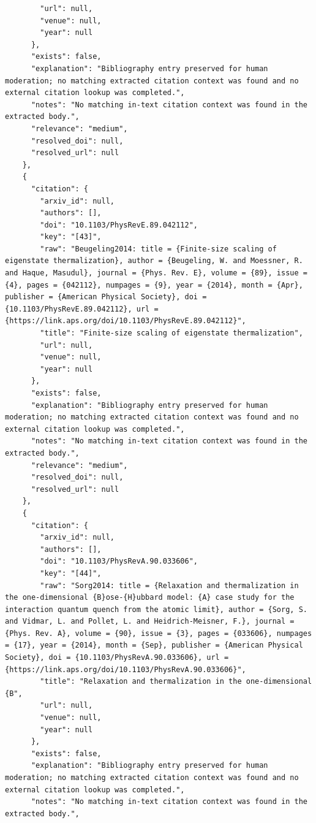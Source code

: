 \documentclass[11pt]{article}
\begin{document}
\begin{verbatim}
        "url": null,
        "venue": null,
        "year": null
      },
      "exists": false,
      "explanation": "Bibliography entry preserved for human moderation; no matching extracted citation context was found and no external citation lookup was completed.",
      "notes": "No matching in-text citation context was found in the extracted body.",
      "relevance": "medium",
      "resolved_doi": null,
      "resolved_url": null
    },
    {
      "citation": {
        "arxiv_id": null,
        "authors": [],
        "doi": "10.1103/PhysRevE.89.042112",
        "key": "[43]",
        "raw": "Beugeling2014: title = {Finite-size scaling of eigenstate thermalization}, author = {Beugeling, W. and Moessner, R. and Haque, Masudul}, journal = {Phys. Rev. E}, volume = {89}, issue = {4}, pages = {042112}, numpages = {9}, year = {2014}, month = {Apr}, publisher = {American Physical Society}, doi = {10.1103/PhysRevE.89.042112}, url = {https://link.aps.org/doi/10.1103/PhysRevE.89.042112}",
        "title": "Finite-size scaling of eigenstate thermalization",
        "url": null,
        "venue": null,
        "year": null
      },
      "exists": false,
      "explanation": "Bibliography entry preserved for human moderation; no matching extracted citation context was found and no external citation lookup was completed.",
      "notes": "No matching in-text citation context was found in the extracted body.",
      "relevance": "medium",
      "resolved_doi": null,
      "resolved_url": null
    },
    {
      "citation": {
        "arxiv_id": null,
        "authors": [],
        "doi": "10.1103/PhysRevA.90.033606",
        "key": "[44]",
        "raw": "Sorg2014: title = {Relaxation and thermalization in the one-dimensional {B}ose-{H}ubbard model: {A} case study for the interaction quantum quench from the atomic limit}, author = {Sorg, S. and Vidmar, L. and Pollet, L. and Heidrich-Meisner, F.}, journal = {Phys. Rev. A}, volume = {90}, issue = {3}, pages = {033606}, numpages = {17}, year = {2014}, month = {Sep}, publisher = {American Physical Society}, doi = {10.1103/PhysRevA.90.033606}, url = {https://link.aps.org/doi/10.1103/PhysRevA.90.033606}",
        "title": "Relaxation and thermalization in the one-dimensional {B",
        "url": null,
        "venue": null,
        "year": null
      },
      "exists": false,
      "explanation": "Bibliography entry preserved for human moderation; no matching extracted citation context was found and no external citation lookup was completed.",
      "notes": "No matching in-text citation context was found in the extracted body.",

\end{verbatim}
\end{document}
